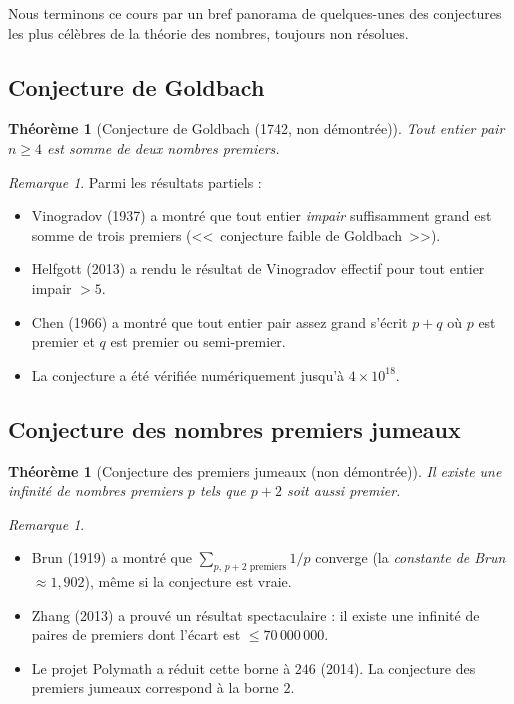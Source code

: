 \documentclass[12pt,a4paper,openany]{book}
\theoremstyle{definition}
\theoremstyle{plain}
\newtheorem{theoreme}[definition]{Théorème}
\theoremstyle{remark}
\newtheorem{remarque}[definition]{Remarque}
\begin{document}
Nous terminons ce cours par un bref panorama de quelques-unes des conjectures
les plus célèbres de la théorie des nombres, toujours non résolues.

\subsection{Conjecture de Goldbach}
\label{subsec:goldbach}

\begin{theoreme}[Conjecture de Goldbach (1742, non démontrée)]
\label{conj:goldbach}
Tout entier pair $n \geq 4$ est somme de deux nombres premiers.
\end{theoreme}

\begin{remarque}
\label{rem:goldbach-progres}
Parmi les résultats partiels :
\begin{itemize}
  \item Vinogradov (1937) a montré que tout entier
    \emph{impair} suffisamment grand est somme de trois premiers
    (<<~conjecture faible de Goldbach~>>).
  \item Helfgott (2013) a rendu le résultat de Vinogradov
    effectif pour tout entier impair $> 5$.
  \item Chen (1966) a montré que tout entier pair assez
    grand s'écrit $p + q$ où $p$ est premier et $q$ est premier ou semi-premier.
  \item La conjecture a été vérifiée numériquement jusqu'à $4 \times 10^{18}$.
\end{itemize}
\end{remarque}

\subsection{Conjecture des nombres premiers jumeaux}
\label{subsec:premiers-jumeaux}

\begin{theoreme}[Conjecture des premiers jumeaux (non démontrée)]
\label{conj:jumeaux}
Il existe une infinité de nombres premiers $p$ tels que $p + 2$ soit aussi premier.
\end{theoreme}

\begin{remarque}
\label{rem:jumeaux-progres}
\begin{itemize}
  \item Brun (1919) a montré que $\sum_{p,\,p+2\text{ premiers}} 1/p$
    converge (la \emph{constante de Brun} $\approx 1{,}902$),
    même si la conjecture est vraie.
  \item Zhang (2013) a prouvé un résultat spectaculaire :
    il existe une infinité de paires de premiers dont l'écart est $\leq 70\,000\,000$.
  \item Le projet Polymath a réduit cette borne à $246$ (2014).
    La conjecture des premiers jumeaux correspond à la borne $2$.
\end{itemize}
\end{remarque}
\end{document}
